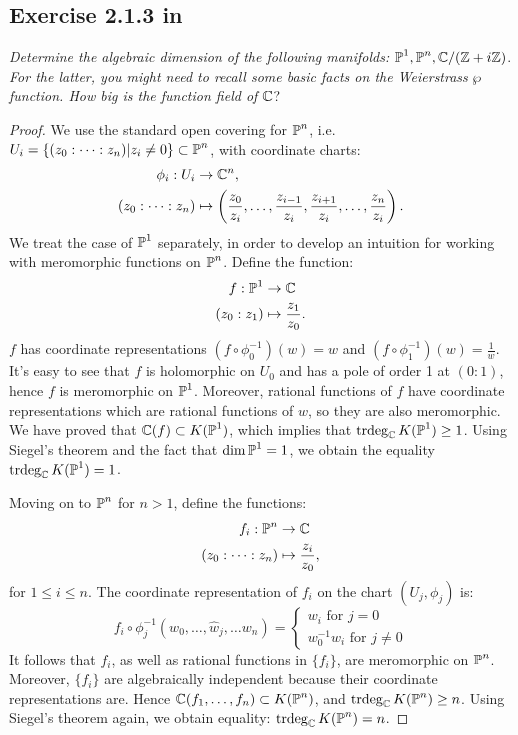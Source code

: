 \documentclass{article}
\begin{document}
\subsection*{Exercise 2.1.3 in \cite{Huy}}
\textit{Determine the algebraic dimension of the following manifolds:} $\operatorname{\mathbb{P}}^1, \operatorname{\mathbb{P}}^n, \mathbb{C}/(\mathbb{Z} + i\mathbb{Z})$.
\textit{For the latter, you might need to recall some basic facts on the Weierstrass} $\wp$
\textit{function. How big is the function field of} $\mathbb{C}$?
\begin{proof}
We use the standard open covering for $\operatorname{\mathbb{P}}^n$, i.e. $U_i = \{(z_0:\dots:z_n)|z_i\neq 0\} \subset \operatorname{\mathbb{P}}^n$,
with coordinate charts:
\begin{align*}
\phi_i : U_i &\to \mathbb{C}^n, \\
(z_0:\dots:z_n) &\mapsto \left(\frac{z_0}{z_i}, \dots, \frac{z_{i-1}}{z_i}, \frac{z_{i+1}}{z_i}, \dots,
\frac{z_n}{z_i} \right).
\end{align*}
We treat the case of $\operatorname{\mathbb{P}}^1$ separately, in order to develop an intuition for working with meromorphic
functions on $\operatorname{\mathbb{P}}^n$. Define the function:
\begin{align*}
f : \operatorname{\mathbb{P}}^1 &\to \mathbb{C} \\
(z_0:z_1) &\mapsto \frac{z_1}{z_0}.
\end{align*}
$f$ has coordinate representations $(f \circ \phi^{-1}_0)(w) = w$ and $(f\circ \phi^{-1}_1)(w) = \frac{1}{w}$.
It's easy to see that $f$ is holomorphic on $U_0$ and has a pole of order 1 at $(0:1)$, hence $f$ is meromorphic
on $\operatorname{\mathbb{P}}^1$. Moreover, rational functions of $f$ have coordinate representations which are rational functions
of $w$, so they are also meromorphic. We have proved that $\mathbb{C}(f) \subset K(\operatorname{\mathbb{P}}^1)$, which implies that 
$\operatorname{trdeg}_{\mathbb{C}} K(\operatorname{\mathbb{P}}^1) \geq 1$. Using Siegel's theorem and the fact that $\dim \operatorname{\mathbb{P}}^1 = 1$, we obtain the equality
$\operatorname{trdeg}_{\mathbb{C}} K(\operatorname{\mathbb{P}}^1) = 1$.

Moving on to $\operatorname{\mathbb{P}}^n$ for $n>1$, define the functions:
\begin{align*}
f_i : \operatorname{\mathbb{P}}^n &\to \mathbb{C} \\
(z_0:\dots:z_n) &\mapsto \frac{z_i}{z_0},
\end{align*}
for $1\leq i \leq n$. The coordinate representation of $f_i$ on the chart $(U_j, \phi_j)$ is:
\[	f_i\circ \phi_j^{-1}(w_0, \dots, \hat w_j, \dots w_n) =
\left\{ \begin{array} {c}
w_i \text{ for } j=0 \\
w_0^{-1}w_i \text{ for } j\neq 0
\end{array}\right.	\]
It follows that $f_i$, as well as rational functions in $\{f_i\}$, are meromorphic on $\operatorname{\mathbb{P}}^n$.
Moreover, $\{f_i\}$ are algebraically independent because their coordinate representations are.
Hence $\mathbb{C}(f_1, \dots, f_n) \subset K(\operatorname{\mathbb{P}}^n)$, and $\operatorname{trdeg}_{\mathbb{C}} K(\operatorname{\mathbb{P}}^n) \geq n$. Using Siegel's
theorem again, we obtain equality: $\operatorname{trdeg}_{\mathbb{C}} K(\operatorname{\mathbb{P}}^n) = n$.


\end{proof}
\end{document}
